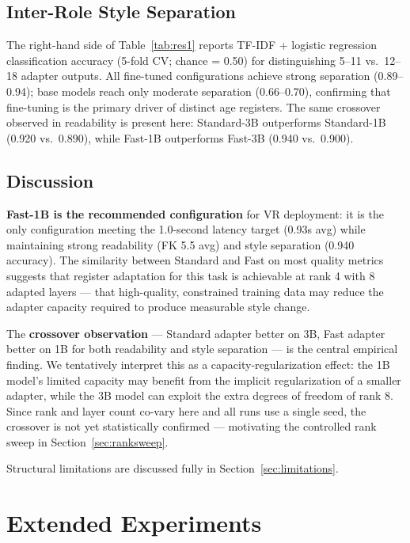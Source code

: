 \documentclass[AMA,Times1COL]{WileyNJDv5} %
\begin{document}
\subsection{Inter-Role Style Separation}

The right-hand side of Table~\ref{tab:res1} reports TF-IDF + logistic regression classification accuracy (5-fold CV; chance = 0.50) for distinguishing 5--11 vs.\ 12--18 adapter outputs. All fine-tuned configurations achieve strong separation (0.89--0.94); base models reach only moderate separation (0.66--0.70), confirming that fine-tuning is the primary driver of distinct age registers. The same crossover observed in readability is present here: Standard-3B outperforms Standard-1B (0.920 vs.\ 0.890), while Fast-1B outperforms Fast-3B (0.940 vs.\ 0.900).


\subsection{Discussion}

\textbf{Fast-1B is the recommended configuration} for VR deployment: it is the only configuration meeting the 1.0-second latency target (0.93s avg) while maintaining strong readability (FK 5.5 avg) and style separation (0.940 accuracy). The similarity between Standard and Fast on most quality metrics suggests that register adaptation for this task is achievable at rank 4 with 8 adapted layers --- that high-quality, constrained training data may reduce the adapter capacity required to produce measurable style change.

The \textbf{crossover observation} --- Standard adapter better on 3B, Fast adapter better on 1B for both readability and style separation --- is the central empirical finding. We tentatively interpret this as a capacity-regularization effect: the 1B model's limited capacity may benefit from the implicit regularization of a smaller adapter, while the 3B model can exploit the extra degrees of freedom of rank 8. Since rank and layer count co-vary here and all runs use a single seed, the crossover is not yet statistically confirmed --- motivating the controlled rank sweep in Section~\ref{sec:ranksweep}.

Structural limitations are discussed fully in Section~\ref{sec:limitations}.

\section{Extended Experiments}\label{sec:extended}
\end{document}
